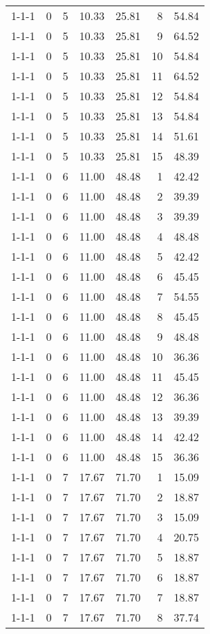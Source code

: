 \begin{tabular}{lrrrrrr}
1-1-1 & 0 & 5 & 10.33 & 25.81 & 8 & 54.84 \\
1-1-1 & 0 & 5 & 10.33 & 25.81 & 9 & 64.52 \\
1-1-1 & 0 & 5 & 10.33 & 25.81 & 10 & 54.84 \\
1-1-1 & 0 & 5 & 10.33 & 25.81 & 11 & 64.52 \\
1-1-1 & 0 & 5 & 10.33 & 25.81 & 12 & 54.84 \\
1-1-1 & 0 & 5 & 10.33 & 25.81 & 13 & 54.84 \\
1-1-1 & 0 & 5 & 10.33 & 25.81 & 14 & 51.61 \\
1-1-1 & 0 & 5 & 10.33 & 25.81 & 15 & 48.39 \\
1-1-1 & 0 & 6 & 11.00 & 48.48 & 1 & 42.42 \\
1-1-1 & 0 & 6 & 11.00 & 48.48 & 2 & 39.39 \\
1-1-1 & 0 & 6 & 11.00 & 48.48 & 3 & 39.39 \\
1-1-1 & 0 & 6 & 11.00 & 48.48 & 4 & 48.48 \\
1-1-1 & 0 & 6 & 11.00 & 48.48 & 5 & 42.42 \\
1-1-1 & 0 & 6 & 11.00 & 48.48 & 6 & 45.45 \\
1-1-1 & 0 & 6 & 11.00 & 48.48 & 7 & 54.55 \\
1-1-1 & 0 & 6 & 11.00 & 48.48 & 8 & 45.45 \\
1-1-1 & 0 & 6 & 11.00 & 48.48 & 9 & 48.48 \\
1-1-1 & 0 & 6 & 11.00 & 48.48 & 10 & 36.36 \\
1-1-1 & 0 & 6 & 11.00 & 48.48 & 11 & 45.45 \\
1-1-1 & 0 & 6 & 11.00 & 48.48 & 12 & 36.36 \\
1-1-1 & 0 & 6 & 11.00 & 48.48 & 13 & 39.39 \\
1-1-1 & 0 & 6 & 11.00 & 48.48 & 14 & 42.42 \\
1-1-1 & 0 & 6 & 11.00 & 48.48 & 15 & 36.36 \\
1-1-1 & 0 & 7 & 17.67 & 71.70 & 1 & 15.09 \\
1-1-1 & 0 & 7 & 17.67 & 71.70 & 2 & 18.87 \\
1-1-1 & 0 & 7 & 17.67 & 71.70 & 3 & 15.09 \\
1-1-1 & 0 & 7 & 17.67 & 71.70 & 4 & 20.75 \\
1-1-1 & 0 & 7 & 17.67 & 71.70 & 5 & 18.87 \\
1-1-1 & 0 & 7 & 17.67 & 71.70 & 6 & 18.87 \\
1-1-1 & 0 & 7 & 17.67 & 71.70 & 7 & 18.87 \\
1-1-1 & 0 & 7 & 17.67 & 71.70 & 8 & 37.74 \\

\end{tabular}
